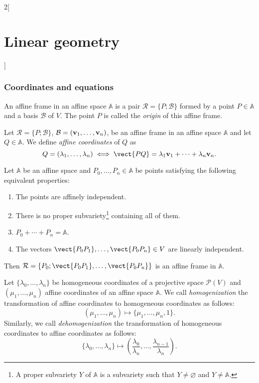 \documentclass[../../../main.tex]{subfiles}
\begin{document}
\begin{multicols}{2}[\section{Linear geometry}]
  \subsubsection{Coordinates and equations}
  \begin{definition}
    An affine frame in an affine space $\mathbb{A}$ is a pair $\mathcal{R}=\{P;\mathcal{B}\}$ formed by a point $P\in\mathbb{A}$ and a basis $\mathcal{B}$ of $V$. The point $P$ is called the \emph{origin} of this affine frame.
  \end{definition}
  \begin{definition}
    Let $\mathcal{R}=\{P;\mathcal{B}\}$, $\mathcal{B}=(\boldsymbol{\mathrm{v}}_1,\ldots,\boldsymbol{\mathrm{v}}_n)$, be an affine frame in an affine space $\mathbb{A}$ and let $Q\in\mathbb{A}$. We define \emph{affine coordinates} of $Q$ as $$Q=(\lambda_1,\ldots,\lambda_n)\iff\vect{PQ}=\lambda_1\vf{v}_1+\cdots+\lambda_n\vf{v}_n.$$
  \end{definition}
  \begin{proposition}
    Let $\mathbb{A}$ be an affine space and $P_0,\ldots,P_n\in\mathbb{A}$ be points satisfying the following equivalent properties:
    \begin{enumerate}
      \item The points are affinely independent.
      \item There is no proper subvariety\footnote{A proper subvariety $Y$ of $\mathbb{A}$ is a subvariety such that $Y\ne\varnothing$ and  $Y\ne\mathbb{A}$.} containing all of them.
      \item $P_0+\cdots+P_n=\mathbb{A}$.
      \item The vectors $\vect{P_0P_1},\ldots,\vect{P_0P_n}\in V$ are linearly independent.
    \end{enumerate}
    Then $\mathcal{R}=\{P_0;\vect{P_0P_1},\ldots,\vect{P_0P_n}\}$ is an affine frame in $\mathbb{A}$.
  \end{proposition}
  \begin{definition}
    Let $\{\lambda_0,\ldots,\lambda_n\}$ be homogeneous coordinates of a projective space $\mathcal{P}(V)$ and $(\mu_1,\ldots,\mu_n)$ affine coordinates of an affine space $\mathbb{A}$. We call \emph{homogenization} the transformation of affine coordinates to homogeneous coordinates as follows: $$(\mu_1,\ldots,\mu_n)\longmapsto\{\mu_1,\ldots,\mu_n,1\}.$$ Similarly, we call \emph{dehomogenization} the transformation of homogeneous coordinates to affine coordinates as follows: $$\{\lambda_0,\ldots,\lambda_n\}\longmapsto\left(\frac{\lambda_0}{\lambda_n},\ldots,\frac{\lambda_{n-1}}{\lambda_n}\right).$$

\end{definition}
\end{multicols}
\end{document}
